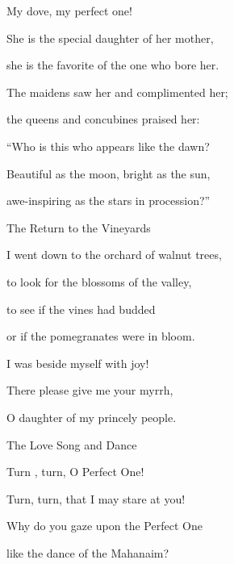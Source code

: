{\par }{\Q My dove,
my perfect
one!
\par }{\Q She
is the special daughter of her mother,
\par }{\Q she is the favorite
of the one who bore
her.
\par }{\Q The maidens
saw
her and complimented
her;

\par }{\Q the queens
and concubines
praised her:
\par }{\Q {}“Who
is this
who appears
like
the dawn?

\par }{\Q Beautiful
as the moon,
bright
as the sun,
\par }{\Q awe-inspiring
as the stars in procession?”
\par }{\SH The Return to the Vineyards
\par }{\SH 
{}
\par }{\Q {}I went down
to
the orchard
of walnut trees,
\par }{\Q to look
for the blossoms
of the valley,
\par }{\Q to see
if the vines
had budded
\par }{\Q or if the pomegranates
were in bloom.
\par }{\Q I was beside
myself
with joy!

\par }{\Q There please give
me your myrrh,
\par }{\Q O daughter of my princely
people.
\par }{\SH The Love Song and Dance
\par }{\SH 
{}
\par }{\Q {}Turn , turn, O Perfect One!
\par }{\Q Turn, turn, that I may stare at you!
\par }{
\par }{\Q Why do you gaze upon the Perfect One
\par }{\Q like the dance of the Mahanaim?

\par }
